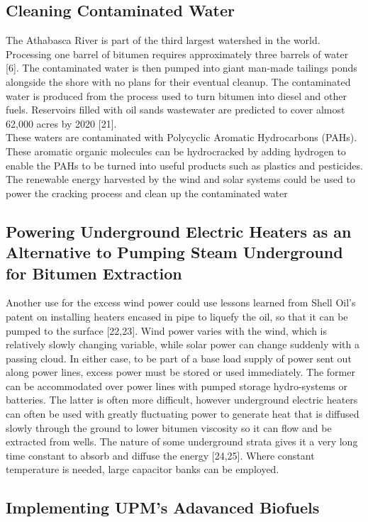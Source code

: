 \documentclass[11pt]{article}
\begin{document}
\subsection{Cleaning Contaminated Water}
The Athabasca River is part of the third largest watershed in the world. Processing one barrel of bitumen requires approximately three barrels of water [6]. The contaminated water is then pumped into giant man-made tailings ponds alongside the shore with no plans for their eventual cleanup.  The contaminated water is produced from the process used to turn bitumen into diesel and other fuels. Reservoirs filled with oil sands wastewater are predicted to cover almost 62,000 acres by 2020 [21]. \\

These waters are contaminated with Polycyclic Aromatic Hydrocarbons (PAHs). These aromatic organic molecules can be hydrocracked by adding hydrogen to enable the PAHs to be turned into useful products such as plastics and pesticides. The renewable energy harvested by the wind and solar systems could be used to power the cracking process and clean up the contaminated water

\subsection{Powering Underground Electric Heaters as an Alternative to Pumping Steam Underground for Bitumen Extraction}

Another use for the excess wind power could use lessons learned from Shell Oil’s patent on installing heaters encased in pipe to liquefy the oil, so that it can be pumped to the surface [22,23]. Wind power varies with the wind, which is relatively slowly changing variable, while solar power can change suddenly with a passing cloud. In either case, to be part of a base load supply of power sent out along power lines, excess power must be stored or used immediately. The former can be accommodated over power lines with pumped storage hydro-systems or batteries. The latter is often more difficult, however underground electric heaters can often be used with greatly fluctuating power to generate heat that is diffused slowly through the ground to lower bitumen viscosity so it can flow and be extracted from wells. The nature of some underground strata gives it a very long time constant to absorb and diffuse the energy [24,25]. Where constant temperature is needed, large capacitor banks can be employed.

\subsection{Implementing UPM's Adavanced Biofuels}
\end{document}
